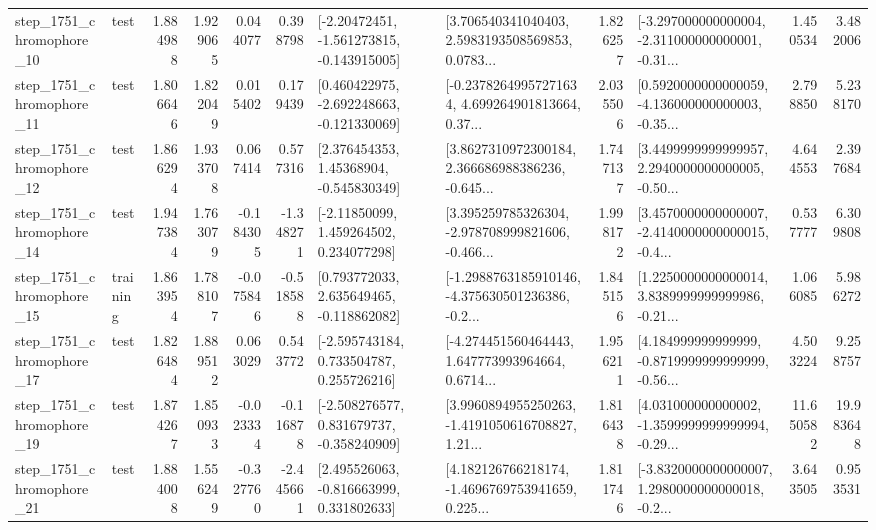 \begin{tabular}{llrrrrllrlrr}
 step\_1751\_chromophore\_10 &      test &      1.884988 &    1.929065 &      0.044077 &  0.398798 &   [-2.20472451, -1.561273815, -0.143915005] &  [3.706540341040403, 2.5983193508569853, 0.0783... &       1.826257 &  [-3.297000000000004, -2.311000000000001, -0.31... &            1.450534 &          3.482006 \\
 step\_1751\_chromophore\_11 &      test &      1.806646 &    1.822049 &      0.015402 &  0.179439 &   [0.460422975, -2.692248663, -0.121330069] &  [-0.23782649957271634, 4.699264901813664, 0.37... &       2.035506 &  [0.5920000000000059, -4.136000000000003, -0.35... &            2.798850 &          5.238170 \\
 step\_1751\_chromophore\_12 &      test &      1.866294 &    1.933708 &      0.067414 &  0.577316 &     [2.376454353, 1.45368904, -0.545830349] &  [3.8627310972300184, 2.366686988386236, -0.645... &       1.747137 &  [3.4499999999999957, 2.2940000000000005, -0.50... &            4.644553 &          2.397684 \\
 step\_1751\_chromophore\_14 &      test &      1.947384 &    1.763079 &     -0.184305 & -1.348271 &     [-2.11850099, 1.459264502, 0.234077298] &  [3.395259785326304, -2.978708999821606, -0.466... &       1.998172 &  [3.4570000000000007, -2.4140000000000015, -0.4... &            0.537777 &          6.309808 \\
 step\_1751\_chromophore\_15 &  training &      1.863954 &    1.788107 &     -0.075846 & -0.518588 &    [0.793772033, 2.635649465, -0.118862082] &  [-1.2988763185910146, -4.375630501236386, -0.2... &       1.845156 &  [1.2250000000000014, 3.8389999999999986, -0.21... &            1.066085 &          5.986272 \\
 step\_1751\_chromophore\_17 &      test &      1.826484 &    1.889512 &      0.063029 &  0.543772 &    [-2.595743184, 0.733504787, 0.255726216] &  [-4.274451560464443, 1.647773993964664, 0.6714... &       1.956211 &  [4.184999999999999, -0.8719999999999999, -0.56... &            4.503224 &          9.258757 \\
 step\_1751\_chromophore\_19 &      test &      1.874267 &    1.850933 &     -0.023334 & -0.116878 &   [-2.508276577, 0.831679737, -0.358240909] &  [3.9960894955250263, -1.4191050616708827, 1.21... &       1.816438 &  [4.031000000000002, -1.3599999999999994, -0.29... &           11.650582 &         19.983648 \\
 step\_1751\_chromophore\_21 &      test &      1.884008 &    1.556249 &     -0.327760 & -2.445661 &    [2.495526063, -0.816663999, 0.331802633] &  [4.182126766218174, -1.4696769753941659, 0.225... &       1.811746 &  [-3.8320000000000007, 1.2980000000000018, -0.2... &            3.643505 &          0.953531 \\

\end{tabular}
